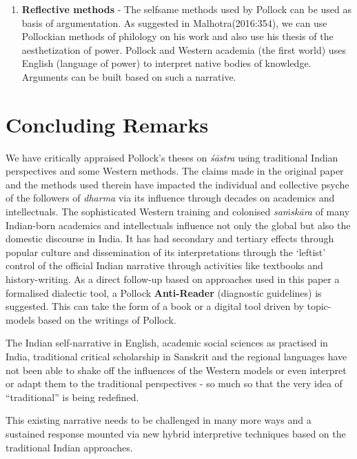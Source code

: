 \begin{enumerate}
\item {\bf Reflective methods} - The selfsame methods used by Pollock can be used as basis of argumentation. As suggested in Malhotra(2016:354), we can use Pollockian methods of philology on his work and also use his thesis of the aesthetization of power. Pollock and Western academia (the first world) uses English (language of power) to interpret native bodies of knowledge. Arguments can be built based on such a narrative.
\end{enumerate}

\section*{Concluding Remarks}

We have critically appraised Pollock's theses on {\sl śāstra} using traditional Indian perspectives and some Western methods. The claims made in the original paper and the methods used therein have impacted the individual and collective psyche of the followers of {\sl dharma} via its influence through decades on academics and intellectuals. The sophisticated Western training and colonised {\sl saṁskāra} of many Indian-born academics and intellectuals influence not only the global but also the domestic discourse in India. It has had secondary and tertiary effects through popular culture and dissemination of its interpretations through the `leftist' control of the official Indian narrative through activities like textbooks and history-writing. As a direct follow-up based on approaches used in this paper a formalised dialectic tool, a Pollock {\bf Anti-Reader} (diagnostic guidelines) is suggested. This can take the form of a book or a digital tool driven by topic-models based on the writings of Pollock.

The Indian self-narrative in English, academic social sciences as practised in India, traditional critical scholarship in Sanskrit and the regional languages  have not been able to shake off the influences of the Western models or even interpret or adapt them to the traditional perspectives - so much so that the very idea of ``traditional'' is being redefined.

This existing narrative needs to be challenged in many more ways and a sustained response mounted via new hybrid interpretive techniques based on the traditional Indian approaches. 

